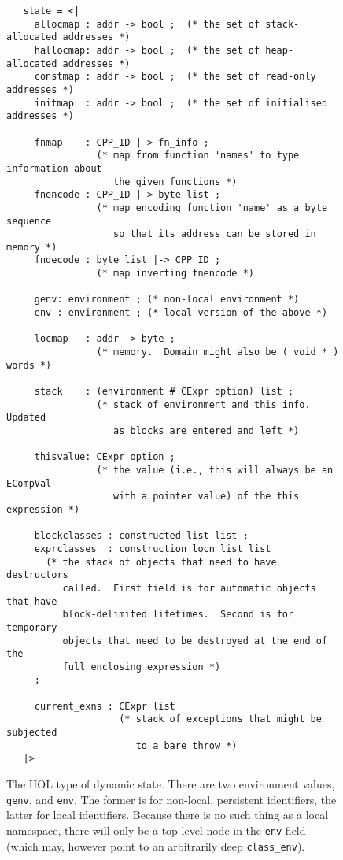 \documentclass[11pt]{article}
\begin{document}
\begin{figure}[htbp]
\footnotesize
\begin{verbatim}
   state = <| 
     allocmap : addr -> bool ;  (* the set of stack-allocated addresses *)
     hallocmap: addr -> bool ;  (* the set of heap-allocated addresses *)
     constmap : addr -> bool ;  (* the set of read-only addresses *)
     initmap  : addr -> bool ;  (* the set of initialised addresses *)

     fnmap    : CPP_ID |-> fn_info ;
                (* map from function 'names' to type information about
                   the given functions *)
     fnencode : CPP_ID |-> byte list ;
                (* map encoding function 'name' as a byte sequence
                   so that its address can be stored in memory *)
     fndecode : byte list |-> CPP_ID ;
                (* map inverting fnencode *)

     genv: environment ; (* non-local environment *)
     env : environment ; (* local version of the above *)

     locmap   : addr -> byte ;
                (* memory.  Domain might also be ( void * ) words *)

     stack    : (environment # CExpr option) list ;
                (* stack of environment and this info.  Updated
                   as blocks are entered and left *)

     thisvalue: CExpr option ;
                (* the value (i.e., this will always be an ECompVal
                   with a pointer value) of the this expression *)

     blockclasses : constructed list list ;
     exprclasses  : construction_locn list list
       (* the stack of objects that need to have destructors
          called.  First field is for automatic objects that have
          block-delimited lifetimes.  Second is for temporary
          objects that need to be destroyed at the end of the
          full enclosing expression *)
     ;

     current_exns : CExpr list  
                    (* stack of exceptions that might be subjected 
                       to a bare throw *)
   |>
\end{verbatim}
  \caption{The HOL type of dynamic state.  There are two environment
    values, \texttt{genv}, and \texttt{env}.  The former is for
    non-local, persistent identifiers, the latter for local
    identifiers.  Because there is no such thing as a local namespace,
    there will only be a top-level node in the \texttt{env} field
    (which may, however point to an arbitrarily deep
    \texttt{class_env}).}
\label{fig:state-type}
\end{figure}
\end{document}
